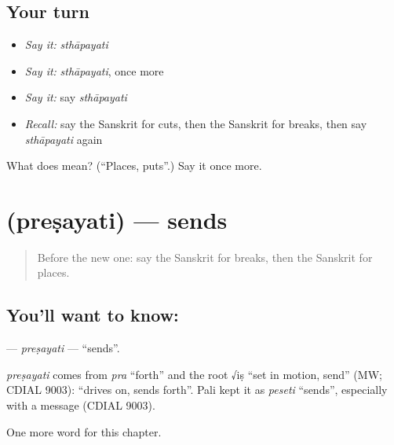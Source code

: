 \subsection*{Your turn}
\begin{itemize}
\raggedright
  \item \emph{Say it:} \emph{sthāpayati}
  \item \emph{Say it:} \emph{sthāpayati}, once more
  \item \emph{Say it:} say \emph{sthāpayati}
  \item \emph{Recall:} say the Sanskrit for cuts, then the Sanskrit for breaks, then say \emph{sthāpayati} again
\end{itemize}

\begin{tcolorbox}[breakable,colback=teal!4,colframe=teal!35!black,title={Before you move on}]
What does  mean? (\textquotedblleft{}Places, puts\textquotedblright{}.) Say it once more.
\end{tcolorbox}
\section[\texorpdfstring{\sk{प्रेषयति} (preṣayati)}{प्रेषयति (preṣayati)}]{ (preṣayati) — sends}

\label{lesson:SA-C134-presayati}



\begin{quote}
Before the new one: say the Sanskrit for breaks, then the Sanskrit for places.
\end{quote}

\subsection*{You'll want to know: }
\textbf{} — \emph{preṣayati} — \textquotedblleft{}sends\textquotedblright{}.

\begin{cousinweb}
\emph{preṣayati} comes from \emph{pra} \textquotedblleft{}forth\textquotedblright{} and the root √iṣ \textquotedblleft{}set in motion, send\textquotedblright{} (MW; CDIAL 9003): \textquotedblleft{}drives on, sends forth\textquotedblright{}. Pali kept it as \emph{peseti} \textquotedblleft{}sends\textquotedblright{}, especially with a message (CDIAL 9003).
\end{cousinweb}

\begin{grammarlens}[title={What you've built}]
One more word for this chapter.
\end{grammarlens}

